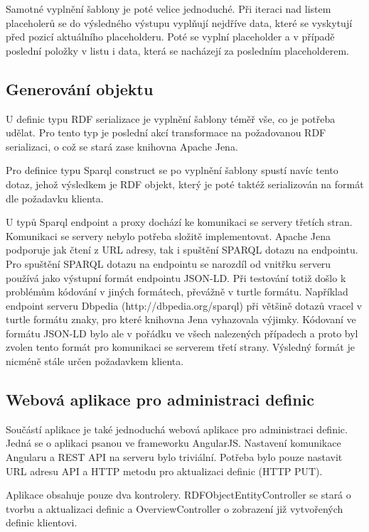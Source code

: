 \documentclass[thesis=B,czech]{FITthesis}[2012/06/26]
\begin{document}
  Samotné vyplnění šablony je poté velice jednoduché. Při iteraci nad listem placeholerů se do výsledného výstupu vyplňují nejdříve data, které se vyskytují před
  pozicí aktuálního placeholderu. Poté se vyplní placeholder a v případě poslední položky v listu i data, která se nacházejí za posledním placeholderem.
  
  \subsection{Generování objektu}
  U definic typu RDF serializace je vyplnění šablony téměř vše, co je potřeba udělat. Pro tento typ je poslední akcí transformace na požadovanou RDF serializaci,
  o což se stará zase knihovna Apache Jena.
  
  Pro definice typu Sparql construct se po vyplnění šablony spustí navíc tento dotaz, jehož výsledkem je RDF objekt, který je poté taktéž serializován na formát dle
  požadavku klienta.
  
  U typů Sparql endpoint a proxy dochází ke komunikaci se servery třetích stran. Komunikaci se servery nebylo potřeba složitě implementovat.
  Apache Jena podporuje jak čtení z URL adresy, tak i spuštění SPARQL dotazu na endpointu. Pro spuštění SPARQL dotazu na endpointu se narozdíl od vnitřku serveru
  používá jako výstupní formát endpointu JSON-LD. Při testování totiž došlo k problémům kódování v jiných formátech, převážně v turtle formátu. Například endpoint
  serveru Dbpedia (http://dbpedia.org/sparql) při většině dotazů vracel v turtle formátu znaky, pro které knihovna Jena vyhazovala výjimky. Kódovaní ve formátu
  JSON-LD bylo ale v pořádku ve všech nalezených případech a proto byl zvolen tento formát pro komunikaci se serverem třetí strany. Výsledný formát je nicméně
  stále určen požadavkem klienta.
  
  \subsection{Webová aplikace pro administraci definic}
  Součástí aplikace je také jednoduchá webová aplikace pro administraci definic. Jedná se o aplikaci psanou ve frameworku AngularJS. 
  Nastavení komunikace Angularu a REST API na serveru bylo triviální. Potřeba bylo pouze nastavit URL adresu API a HTTP metodu pro aktualizaci
  definic (HTTP PUT). 
  
  Aplikace obsahuje pouze dva kontrolery. RDFObjectEntityController se stará o tvorbu a aktualizaci definic a OverviewController o zobrazení již vytvořených
  definic klientovi. 
  
\end{document}
